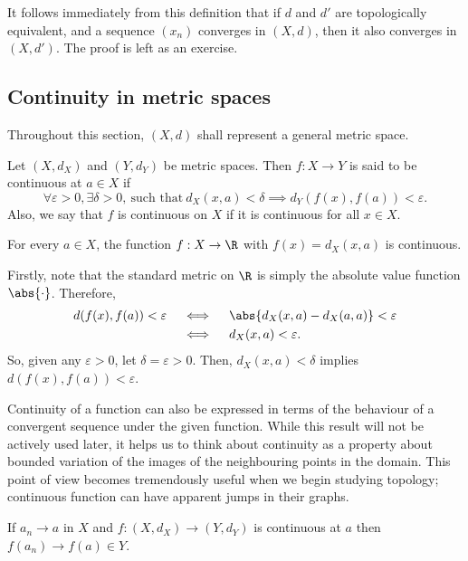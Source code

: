 It follows immediately from this definition that if $d$ and $d'$ are topologically equivalent, and a sequence $(x_n)$ converges in $(X, d)$, then it also converges in $(X, d')$. The proof is left as an exercise.

\subsection{Continuity in metric spaces}
Throughout this section, $(X,d)$ shall represent a general metric space.

\begin{ndfn}
  Let $(X, d_X)$ and $(Y, d_Y)$ be metric spaces. Then $f:X \to Y$ is said to be continuous at $a \in X$ if
  \begin{equation*}
    \forall \varepsilon>0, \exists \delta>0,\ \text{such that}\ d_{X}(x,a) < \delta \implies d_{Y}(f(x), f(a)) < \varepsilon.
  \end{equation*}
  Also, we say that $f$ is continuous on $X$ if it is continuous for all $x \in X$.
\end{ndfn}

\begin{negg}
  For every $a \in X$, the function $f:X \to \R$ with $f(x)=d_{X}(x,a)$ is continuous.

  Firstly, note that the standard metric on $\R$ is simply the absolute value function $\abs{\cdot}$. Therefore,
  \begin{align*}
    d(f(x), f(a)) < \varepsilon
    &\quad\iff\quad \abs{d_{X}(x,a) - d_{X}(a,a)} < \varepsilon\\
    &\quad\iff\quad d_{X}(x,a) < \varepsilon.
  \end{align*}
  So, given any $\varepsilon > 0$, let $\delta = \varepsilon > 0$. Then, $d_{X}(x,a) < \delta$ implies $d(f(x), f(a)) < \varepsilon$.
\end{negg}

Continuity of a function can also be expressed in terms of the behaviour of a convergent sequence under the given function. While this result will not be actively used later, it helps us to think about continuity as a property about bounded variation of the images of the neighbouring points in the domain. This point of view becomes tremendously useful when we begin studying topology; continuous function can have apparent jumps in their graphs.
\begin{nlemma}
  If $a_n \to a$ in $X$ and $f:(X, d_X) \to (Y, d_Y)$ is continuous at $a$ then $f(a_n) \to f(a) \in Y$.
\end{nlemma}

